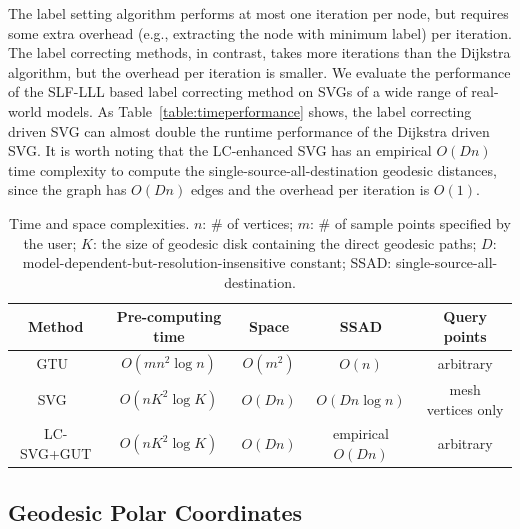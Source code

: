   The label setting algorithm performs at most one iteration per node, but requires some extra overhead (e.g., extracting the node with minimum label) per iteration.
  The label correcting methods, in contrast, takes more iterations than the Dijkstra algorithm, but the overhead per iteration is smaller.
  We evaluate the performance of the SLF-LLL based label correcting method on SVGs of a wide range of real-world models.
  As Table~\ref{table:timeperformance} shows, the label correcting driven SVG can almost double the runtime performance of the Dijkstra driven SVG.
  It is worth noting that the LC-enhanced SVG has an empirical $O(Dn)$ time complexity to compute the single-source-all-destination geodesic distances,
  since the graph has $O(Dn)$ edges and the overhead per iteration is $O(1)$.
  \begin{table}[htbp]
  \centering
  \begin{tabular}{|c|c|c|c|c|}
  \hline
  Method & Pre-computing time & Space & SSAD & Query points\\
  \hline
  \hline
  GTU~\cite{xin2012constant} & $O(mn^2\log n)$ & $O(m^2)$ & $O(n)$ & arbitrary\\
  \hline
  SVG~\cite{Ying13SVG} & $O(nK^2\log K)$ & $O(Dn)$ & $O(Dn\log n)$ & mesh vertices only\\
  \hline
  LC-SVG+GUT & $O(nK^2\log K)$ & $O(Dn)$ & empirical $O(Dn)$ & arbitrary\\
  \hline
  \end{tabular}
  \label{tab:complexity}
  \caption{Time and space complexities.
  $n$: \# of vertices; $m$: \# of sample points specified by the user;
  $K$: the size of geodesic disk containing the direct geodesic paths;
  $D$: model-dependent-but-resolution-insensitive constant;
  SSAD: single-source-all-destination.}
  \end{table}

\subsection{Geodesic Polar Coordinates}

